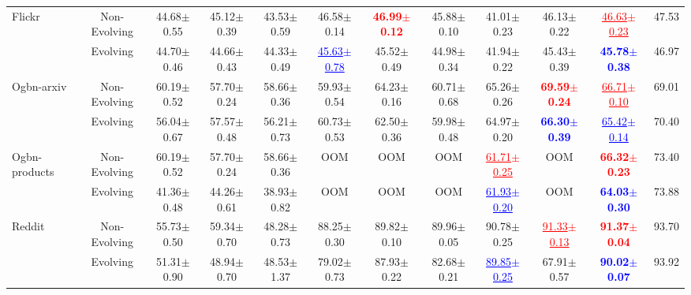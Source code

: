 \begin{table*}[ht!]
{\begin{tabular}{lc|ccc|cccccc|c}
\midrule
\multirow{2}{*}{Flickr} 
  &Non-Evolving& 44.68$\pm$0.55 & 45.12$\pm$0.39 & 43.53$\pm$0.59 & 46.58$\pm$0.14 & \textcolor{red}{\textbf{46.99$\pm$0.12}} & 45.88$\pm$0.10 & 41.01$\pm$0.23 & 46.13$\pm$0.22 & \textcolor{red}{\underline{46.63$\pm$0.23}} & 47.53 \\
  &Evolving& 44.70$\pm$0.46 & 44.66$\pm$0.43 & 44.33$\pm$0.49 & \textcolor{blue}{\underline{45.63$\pm$0.78}}& 45.52$\pm$0.49 & 44.98$\pm$0.34 & 41.94$\pm$0.22 & 45.43$\pm$0.39 &  \textcolor{blue}{\textbf{45.78$\pm$0.38}} & 46.97 \\
  \midrule
  \multirow{2}{*}{Ogbn-arxiv} 
  &Non-Evolving& 60.19$\pm$0.52 & 57.70$\pm$0.24 & 58.66$\pm$0.36 & 59.93$\pm$0.54 & 64.23$\pm$0.16 & 60.71$\pm$0.68 & 65.26$\pm$0.26 &  \textcolor{red}{\textbf{69.59$\pm$0.24}} & \textcolor{red}{\underline{66.71$\pm$0.10}} & 69.01 \\
  &Evolving& 56.04$\pm$0.67 & 57.57$\pm$0.48 & 56.21$\pm$0.73 & 60.73$\pm$0.53 & 62.50$\pm$0.36 & 59.98$\pm$0.48 & 64.97$\pm$0.20 & \textcolor{blue}{\textbf{66.30$\pm$0.39}} & \textcolor{blue}{\underline{65.42$\pm$0.14}} & 70.40 \\
\midrule
\multirow{2}{*}{Ogbn-products} 
  &Non-Evolving& 60.19$\pm$0.52 & 57.70$\pm$0.24 & 58.66$\pm$0.36 & OOM & OOM & OOM & \textcolor{red}{\underline{61.71$\pm$0.25}} & OOM & \textcolor{red}{\textbf{66.32$\pm$0.23}} & 73.40 \\
  &Evolving& 41.36$\pm$0.48 & 44.26$\pm$0.61 & 38.93$\pm$0.82 & OOM & OOM & OOM & \textcolor{blue}{\underline{61.93$\pm$0.20}} & OOM & \textcolor{blue}{\textbf{64.03$\pm$0.30}} & 73.88 \\
\midrule
\multirow{2}{*}{Reddit} 
  &Non-Evolving& 55.73$\pm$0.50 & 59.34$\pm$0.70 & 48.28$\pm$0.73 & 88.25$\pm$0.30 & 89.82$\pm$0.10 & 89.96$\pm$0.05 & 90.78$\pm$0.25 & \textcolor{red}{\underline{91.33$\pm$0.13}} & \textcolor{red}{\textbf{91.37$\pm$0.04}} & 93.70 \\
  &Evolving& 51.31$\pm$0.90 & 48.94$\pm$0.70 & 48.53$\pm$1.37 & 79.02$\pm$0.73 & 87.93$\pm$0.22 & 82.68$\pm$0.21 &\textcolor{blue}{\underline{89.85$\pm$0.25}} & 67.91$\pm$0.57 & \textcolor{blue}{\textbf{90.02$\pm$0.07}} & 93.92 \\
\bottomrule
\end{tabular}}
\label{tab:main_app}
\end{table*}